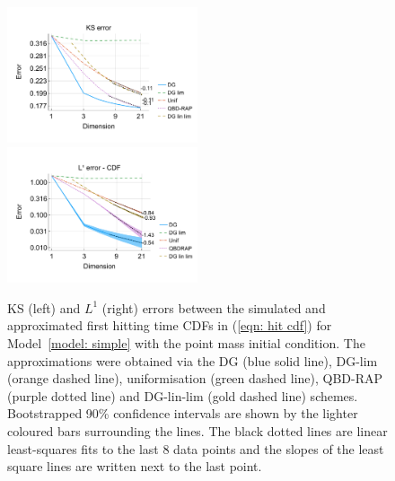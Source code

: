 \begin{figure}[h]
	\centering
	\includegraphics[width=0.5\textwidth,trim={0.75cm 0.8cm 0.25cm 1.25cm},clip]{chapter6/figs/hitting_times_model/hitting_times/point_mass/ks_error_formatted.pdf}%
	\includegraphics[width=0.5\textwidth,trim={0.75cm 0.8cm 0.25cm 1.25cm},clip]{chapter6/figs/hitting_times_model/hitting_times/point_mass/l1_cdf_error_formatted.pdf}
	\caption{KS (left) and \(L^1\) (right) errors between the simulated and approximated first hitting time CDFs in (\ref{eqn: hit cdf}) for Model~\ref{model: simple} with the point mass initial condition. The approximations were obtained via the DG (blue solid line), DG-lim (orange dashed line), uniformisation (green dashed line), QBD-RAP (purple dotted line) and DG-lin-lim (gold dashed line) schemes. Bootstrapped 90\% confidence intervals are shown by the lighter coloured bars surrounding the lines. The black dotted lines are linear least-squares fits to the last 8 data points and the slopes of the least square lines are written next to the last point.} 
	\label{fig: hitting time pm} 
\end{figure}

